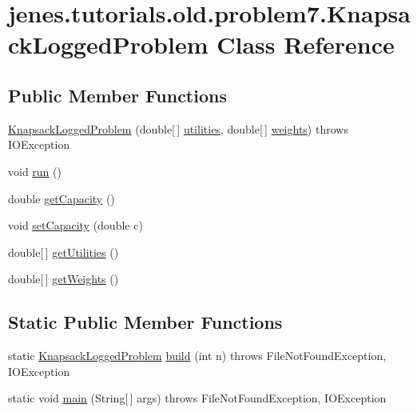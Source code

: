 \hypertarget{classjenes_1_1tutorials_1_1old_1_1problem7_1_1_knapsack_logged_problem}{\section{jenes.\-tutorials.\-old.\-problem7.\-Knapsack\-Logged\-Problem Class Reference}
\label{classjenes_1_1tutorials_1_1old_1_1problem7_1_1_knapsack_logged_problem}
}
\subsection*{Public Member Functions}
\begin{DoxyCompactItemize}
\item 
\hyperlink{classjenes_1_1tutorials_1_1old_1_1problem7_1_1_knapsack_logged_problem_a29a58dbca9c08a57879396daab5f3572}{Knapsack\-Logged\-Problem} (double\mbox{[}$\,$\mbox{]} \hyperlink{classjenes_1_1tutorials_1_1old_1_1problem7_1_1_knapsack_logged_problem_a79dbe5f2f7a1e89ee76c52ef2feadf7d}{utilities}, double\mbox{[}$\,$\mbox{]} \hyperlink{classjenes_1_1tutorials_1_1old_1_1problem7_1_1_knapsack_logged_problem_ac79326330cea056c35124d358cc2c928}{weights})  throws I\-O\-Exception 
\item 
void \hyperlink{classjenes_1_1tutorials_1_1old_1_1problem7_1_1_knapsack_logged_problem_a56e70b4e2ab15b82fee574fd3221e1c9}{run} ()
\item 
double \hyperlink{classjenes_1_1tutorials_1_1old_1_1problem7_1_1_knapsack_logged_problem_a929b6e393d0da3396bd235b10996a1a7}{get\-Capacity} ()
\item 
void \hyperlink{classjenes_1_1tutorials_1_1old_1_1problem7_1_1_knapsack_logged_problem_af8fef0686eac745e86c82e000d8056f8}{set\-Capacity} (double c)
\item 
double\mbox{[}$\,$\mbox{]} \hyperlink{classjenes_1_1tutorials_1_1old_1_1problem7_1_1_knapsack_logged_problem_a6f9e4d8876f6df43cfbd03f8981cf2e2}{get\-Utilities} ()
\item 
double\mbox{[}$\,$\mbox{]} \hyperlink{classjenes_1_1tutorials_1_1old_1_1problem7_1_1_knapsack_logged_problem_a544b9df22c87570cbbe5636ba3af9a10}{get\-Weights} ()
\end{DoxyCompactItemize}
\subsection*{Static Public Member Functions}
\begin{DoxyCompactItemize}
\item 
static \hyperlink{classjenes_1_1tutorials_1_1old_1_1problem7_1_1_knapsack_logged_problem}{Knapsack\-Logged\-Problem} \hyperlink{classjenes_1_1tutorials_1_1old_1_1problem7_1_1_knapsack_logged_problem_a978e0862b0d51bed33093b0739bdf3ef}{build} (int n)  throws File\-Not\-Found\-Exception, I\-O\-Exception 
\item 
static void \hyperlink{classjenes_1_1tutorials_1_1old_1_1problem7_1_1_knapsack_logged_problem_a6c304e5e2b49231b6868e15b87b406da}{main} (String\mbox{[}$\,$\mbox{]} args)  throws File\-Not\-Found\-Exception, I\-O\-Exception 
\end{DoxyCompactItemize}
